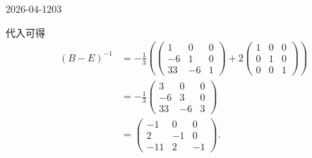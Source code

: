 \begin{mistake}{2026-04-12}{03}
\begin{solutioncontent}
代入可得
\[
\begin{aligned}
(B-E)^{-1}
&=-\frac13\left(
\begin{pmatrix}
1&0&0\\
-6&1&0\\
33&-6&1
\end{pmatrix}
+2
\begin{pmatrix}
1&0&0\\
0&1&0\\
0&0&1
\end{pmatrix}
\right)\\
&=-\frac13
\begin{pmatrix}
3&0&0\\
-6&3&0\\
33&-6&3
\end{pmatrix}\\
&=
\begin{pmatrix}
-1&0&0\\
2&-1&0\\
-11&2&-1
\end{pmatrix}.
\end{aligned}
\]

\end{solutioncontent}


\end{mistake}
